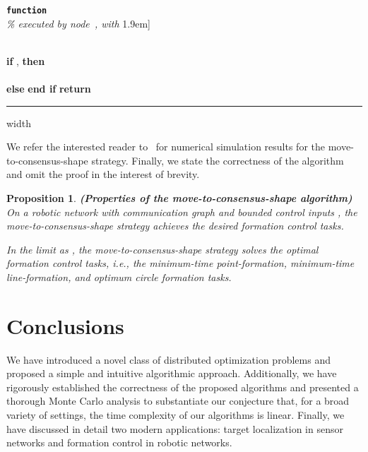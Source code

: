 \documentclass[onecolumn,journal,letterpaper]{IEEEtran}
\newtheorem{proposition}[theorem]{Proposition}
\begin{document}
\medskip

\noindent\textbf{\texttt{function}}   \\
\emph{\% executed by node~, with }\-1.9em]
\begin{algorithmic}[1]
  \STATE \\
  \STATE 
  \STATE \textbf{if} , \textbf{then}\\
  \\
  \textbf{else}  \quad \textbf{end if}
  \STATE \textbf{return} 
\end{algorithmic}

\smallskip \hrule width \linewidth \medskip

We refer the interested reader to~\cite{GN-FB:06d} for numerical simulation
results for the move-to-consensus-shape strategy.  Finally, we state the
correctness of the algorithm and omit the proof in the interest of brevity.

\begin{proposition}
  \textbf{\textup{(Properties of the move-to-consensus-shape algorithm)}}
  On a robotic network with communication graph  and
  bounded control inputs , the move-to-consensus-shape strategy
  achieves the desired formation control tasks.

  In the limit as , the move-to-consensus-shape strategy
  solves the optimal formation control tasks, i.e., the minimum-time
  point-formation, minimum-time line-formation, and optimum circle
  formation tasks.
\end{proposition}















\section{Conclusions}

We have introduced a novel class of distributed optimization problems and
proposed a simple and intuitive algorithmic approach. Additionally, we have
rigorously established the correctness of the proposed algorithms and
presented a thorough Monte Carlo analysis to substantiate our conjecture
that, for a broad variety of settings, the time complexity of our
algorithms is linear. Finally, we have discussed in detail two modern
applications: target localization in sensor networks and formation control
in robotic networks.
\end{document}
